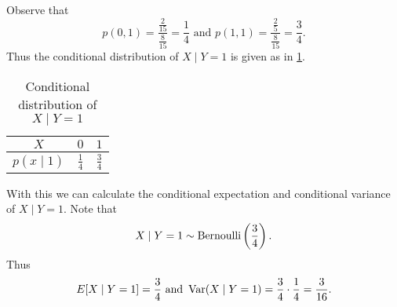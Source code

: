 \documentclass[notoc,notitlepage]{tufte-book}
\begin{document}
\begin{eg}
  Observe that
  \begin{equation*}
    p(0, 1) = \frac{\frac{2}{15}}{\frac{8}{15}} = \frac{1}{4} \text{ and } p(1,
    1) = \frac{\frac{2}{5}}{\frac{8}{15}} = \frac{3}{4}.
  \end{equation*}
  Thus the conditional distribution of $X \mid Y = 1$ is given as in
  \cref{table:conditional_distribution_of_x_mid_y_1}.
  \begin{table}[ht]
    \centering
    \caption{Conditional distribution of $X \mid Y = 1$}
    \label{table:conditional_distribution_of_x_mid_y_1}
    \begin{tabular}{c | c c}
      $X$           & $0$           & $1$ \\
      \hline
      $p(x \mid 1)$ & $\frac{1}{4}$ & $\frac{3}{4}$
    \end{tabular}
  \end{table}

  With this we can calculate the conditional expectation and conditional
  variance of $X \mid Y = 1$. Note that
  \begin{equation*}
    X \mid Y = 1 \sim \operatorname{Bernoulli} \left( \frac{3}{4} \right).
  \end{equation*}
  Thus
  \begin{equation*}
    E[X \mid Y = 1] = \frac{3}{4} \text{ and } \operatorname{Var}(X \mid Y = 1) = \frac{3}{4}
    \cdot \frac{1}{4} = \frac{3}{16}.
  \end{equation*}
\end{eg}
\end{document}
